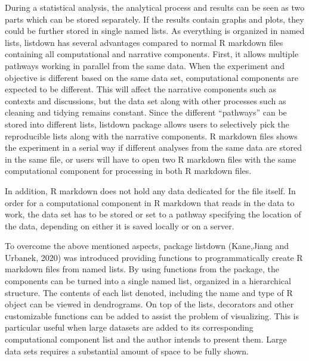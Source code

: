 \documentclass[
]{article}
\begin{document}
During a statistical analysis, the analytical process and results can be
seen as two parts which can be stored separately. If the results contain
graphs and plots, they could be further stored in single named lists. As
everything is organized in named lists, listdown has several advantages
compared to normal R markdown files containing all computational and
narrative components. First, it allows multiple pathways working in
parallel from the same data. When the experiment and objective is
different based on the same data set, computational components are
expected to be different. This will affect the narrative components such
as contexts and discussions, but the data set along with other processes
such as cleaning and tidying remains constant. Since the different
``pathways'' can be stored into different lists, listdown package allows
users to selectively pick the reproducible lists along with the
narrative components. R markdown files shows the experiment in a serial
way if different analyses from the same data are stored in the same
file, or users will have to open two R markdown files with the same
computational component for processing in both R markdown files.

In addition, R markdown does not hold any data dedicated for the file
itself. In order for a computational component in R markdown that reads
in the data to work, the data set has to be stored or set to a pathway
specifying the location of the data, depending on either it is saved
locally or on a server.

To overcome the above mentioned aspects, package listdown (Kane,Jiang
and Urbanek, 2020) was introduced providing functions to
programmatically create R markdown files from named lists. By using
functions from the package, the components can be turned into a single
named list, organized in a hierarchical structure. The contents of each
list denoted, including the name and type of R object can be viewed in
dendrograms. On top of the lists, decorators and other customizable
functions can be added to assist the problem of visualizing. This is
particular useful when large datasets are added to its corresponding
computational component list and the author intends to present them.
Large data sets requires a substantial amount of space to be fully
shown.
\end{document}
